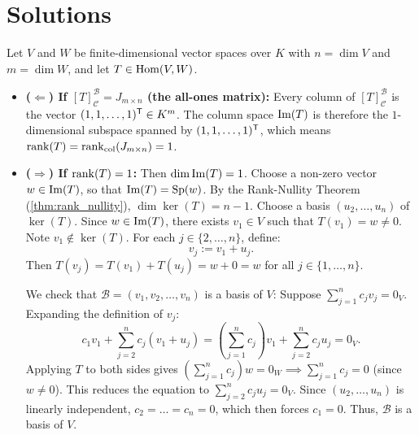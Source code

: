 \section{Solutions}\label{sec:solutions_column_and_row_rank}

\begin{exercisesolution}
\label{sol:rank_one_all_ones_matrix}
Let $V$ and $W$ be finite-dimensional vector spaces over $K$ with $n = \dim V$ and $m = \dim W$, and let $T \in \operatorname{Hom}(V, W)$.

\begin{itemize}
    \item \textbf{($\Leftarrow$) If $[T]_{\mathcal{C}}^{\mathcal{B}} = J_{m \times n}$ (the all-ones matrix):}
    Every column of $[T]_{\mathcal{C}}^{\mathcal{B}}$ is the vector $(1, 1, \dots, 1)^{\mathsf{T}} \in K^m$. The column space $\operatorname{Im}(T)$ is therefore the $1$-dimensional subspace spanned by $(1, 1, \dots, 1)^{\mathsf{T}}$, which means $\operatorname{rank}(T) = \operatorname{rank}_{\text{col}}(J_{m \times n}) = 1$.

    \item \textbf{($\Rightarrow$) If $\operatorname{rank}(T) = 1$:}
    Then $\dim \operatorname{Im}(T) = 1$. Choose a non-zero vector $w \in \operatorname{Im}(T)$, so that $\operatorname{Im}(T) = \operatorname{Sp}(w)$.
    By the Rank-Nullity Theorem (\cref{thm:rank_nullity}), $\dim \ker(T) = n - 1$. Choose a basis $(u_2, \dots, u_n)$ of $\ker(T)$.
    Since $w \in \operatorname{Im}(T)$, there exists $v_1 \in V$ such that $T(v_1) = w \ne 0$. Note $v_1 \notin \ker(T)$.
    For each $j \in \{2, \dots, n\}$, define:
    \[
    v_j := v_1 + u_j.
    \]
    Then $T(v_j) = T(v_1) + T(u_j) = w + 0 = w$ for all $j \in \{1, \dots, n\}$.
    
    We check that $\mathcal{B} = (v_1, v_2, \dots, v_n)$ is a basis of $V$:
    Suppose $\sum_{j=1}^n c_j v_j = 0_V$. Expanding the definition of $v_j$:
    \[
    c_1 v_1 + \sum_{j=2}^n c_j (v_1 + u_j) = \left(\sum_{j=1}^n c_j\right) v_1 + \sum_{j=2}^n c_j u_j = 0_V.
    \]
    Applying $T$ to both sides gives $\left(\sum_{j=1}^n c_j\right) w = 0_W \implies \sum_{j=1}^n c_j = 0$ (since $w \ne 0$).
    This reduces the equation to $\sum_{j=2}^n c_j u_j = 0_V$. Since $(u_2, \dots, u_n)$ is linearly independent, $c_2 = \dots = c_n = 0$, which then forces $c_1 = 0$. Thus, $\mathcal{B}$ is a basis of $V$.


\end{itemize}
\end{exercisesolution}

